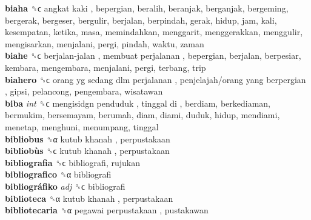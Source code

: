 \textbf{biaha} ␝ϲ   angkat kaki , bepergian, beralih, beranjak, berganjak, bergeming, bergerak, bergeser, bergulir, berjalan, berpindah, gerak, hidup, jam, kali, kesempatan, ketika, masa, memindahkan, menggarit, menggerakkan, menggulir, mengisarkan, menjalani, pergi, pindah, waktu, zaman  \\
\textbf{biahe} ␝ϲ   berjalan-jalan ,  membuat perjalanan , bepergian, berjalan, berpesiar, kembara, mengembara, menjalani, pergi, terbang, trip  \\
\textbf{biahero} ␝ϲ   orang yg sedang dlm perjalanan ,  penjelajah/orang yang berpergian , gipsi, pelancong, pengembara, wisatawan  \\
\textbf{biba} \emph{int}  ␝ϲ   mengisidgn penduduk ,  tinggal di , berdiam, berkediaman, bermukim, bersemayam, berumah, diam, diami, duduk, hidup, mendiami, menetap, menghuni, menumpang, tinggal  \\
\textbf{bibliobus} ␝α   kutub khanah , perpustakaan  \\
\textbf{bibliobùs} ␝ϲ   kutub khanah , perpustakaan  \\
\textbf{bibliografia} ␝ϲ  bibliografi, rujukan  \\
\textbf{bibliografico} ␝α  bibliografi  \\
\textbf{bibliográfiko} \emph{adj}  ␝ϲ  bibliografi  \\
\textbf{biblioteca} ␝α   kutub khanah , perpustakaan  \\
\textbf{bibliotecaria} ␝α   pegawai perpustakaan , pustakawan  \\
